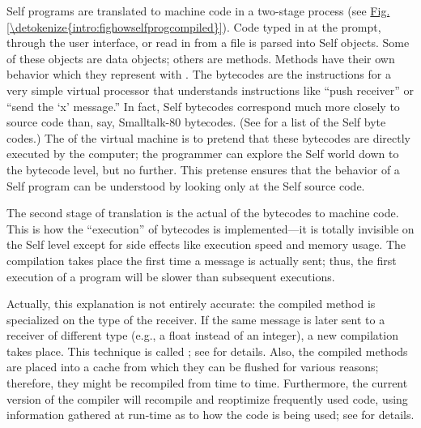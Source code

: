 \documentclass[letterpaper,10pt,english]{sphinxmanual}
\begin{document}
Self programs are translated to machine code in a two-stage process (see \hyperref[\detokenize{intro:fighowselfprogcompiled}]{Fig.\@ \ref{\detokenize{intro:fighowselfprogcompiled}}}). Code typed in at the prompt, through the user interface, or read in from a file is parsed into Self objects. Some of these objects are data objects; others are methods. Methods have their own behavior which they represent with . The bytecodes are the instructions for a very simple virtual processor that understands instructions like “push receiver” or “send the ‘x’ message.” In fact, Self bytecodes correspond much more closely to source code than, say, Smalltalk-80 bytecodes. (See {\hyperref[\detokenize{ref:citations}]{}} for a list of the Self byte codes.) The  of the virtual machine is to pretend that these bytecodes are directly executed by the computer; the programmer can explore the Self world down to the bytecode level, but no further. This pretense ensures that the behavior of a Self program can be understood by looking only at the Self source code.

The second stage of translation is the actual  of the bytecodes to machine code. This is how the “execution” of bytecodes is implemented—it is totally invisible on the Self level except for side effects like execution speed and memory usage. The compilation takes place the first time a message is actually sent; thus, the first execution of a program will be slower than subsequent executions.

Actually, this explanation is not entirely accurate: the compiled method is specialized on the type of the receiver. If the same message is later sent to a receiver of different type (e.g., a float instead of an integer), a new compilation takes place. This technique is called ; see {\hyperref[\detokenize{ref:citations}]{}} for details. Also, the compiled methods are placed into a cache from which they can be flushed for various reasons; therefore, they might be recompiled from time to time. Furthermore, the current version of the compiler will recompile and reoptimize frequently used code, using information gathered at run-time as to how the code is being used; see {\hyperref[\detokenize{ref:citations}]{}} for details.
\end{document}
